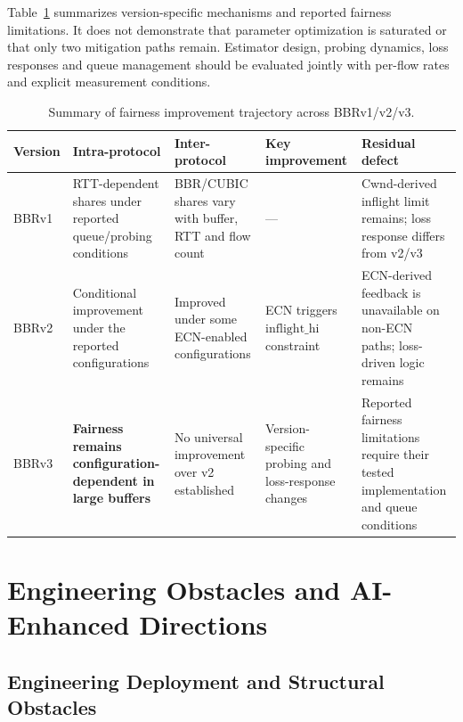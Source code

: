 \documentclass[a4paper,fleqn]{cas-sc}
\begin{document}
Table~\ref{tab:fairness_versions} summarizes version-specific mechanisms
and reported fairness limitations. It does not demonstrate that parameter
optimization is saturated or that only two mitigation paths remain.
Estimator design, probing dynamics, loss responses and queue management
should be evaluated jointly with per-flow rates and explicit measurement
conditions.

\begin{table}[pos=htbp]
  \caption{Summary of fairness improvement trajectory across BBRv1/v2/v3.}
  \label{tab:fairness_versions}
  \small
  \begin{tabularx}{\tblwidth}{@{}p{1.0cm}p{2.3cm}p{2.3cm}p{2.0cm}X@{}}
    \toprule
    \textbf{Version} & \textbf{Intra-protocol} & \textbf{Inter-protocol}
      & \textbf{Key improvement} & \textbf{Residual defect} \\
    \midrule
    BBRv1 & RTT-dependent shares under reported queue/probing conditions &
      BBR/CUBIC shares vary with buffer, RTT and flow count & --- &
      Cwnd-derived inflight limit remains; loss response differs from v2/v3 \\
    \midrule
    BBRv2 & Conditional improvement under the reported configurations &
      Improved under some ECN-enabled configurations &
      ECN triggers $\mathrm{inflight\_hi}$ constraint &
      ECN-derived feedback is unavailable on non-ECN paths; loss-driven logic remains \\
    \midrule
    BBRv3 & \textbf{Fairness remains configuration-dependent in large buffers} &
      No universal improvement over v2 established &
      Version-specific probing and loss-response changes &
      Reported fairness limitations require their tested implementation and queue conditions \\
    \bottomrule
  \end{tabularx}
\end{table}

\FloatBarrier

\section{Engineering Obstacles and AI-Enhanced Directions}
\label{sec:deployment}

\subsection{Engineering Deployment and Structural Obstacles}
\label{sec:engineering}
\end{document}
